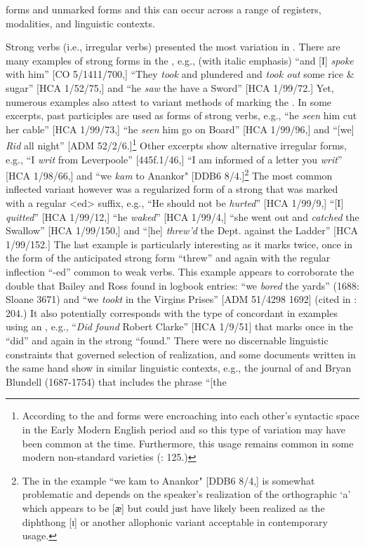  forms and unmarked  forms and this can occur across a range of registers, modalities, and linguistic contexts. 

Strong verbs (i.e., irregular verbs) presented the most variation in . There are many examples of strong  forms in the , e.g., (with italic emphasis) “and [I] \textit{spoke} with him” [CO 5/1411/700,] “They \textit{took} and plundered and \textit{took out} some rice \& sugar” [HCA 1/52/75,] and “he \textit{saw} the  have a Sword” [HCA 1/99/72.] Yet, numerous examples also attest to variant methods of marking the . In some excerpts, past participles are used as  forms of strong verbs, e.g., “he \textit{seen} him cut her cable” [HCA 1/99/73,] “he \textit{seen} him go on Board” [HCA 1/99/96,] and “[we] \textit{Rid} all night” [ADM 52/2/6.]\footnote{According to \citet[95]{Blake2002} the  and  forms were encroaching into each other’s syntactic space in the Early Modern English period and so this type of variation may have been common at the time. Furthermore, this usage remains common in some modern non-standard varieties (\citealt{Cheshire1994}: 125.)} Other excerpts show alternative irregular  forms, e.g., “I \textit{writ} from Leverpoole” [445f.1/46,] “I am informed of a letter you \textit{writ}” [HCA 1/98/66,] and “we \textit{kam} to Anankor" [DDB6 8/4.]\footnote{The  in the example “we kam to Anankor" [DDB6 8/4,] is somewhat problematic and depends on the speaker’s realization of the orthographic ‘a’ which appears to be [{ӕ] but could just have likely been realized as the diphthong [{ɪ}] or another allophonic variant acceptable in contemporary usage.} } The most common inflected variant however was a regularized form of a strong  that was marked with a regular <ed> suffix, e.g., “He should not be \textit{hurted}” [HCA 1/99/9,] “[I] \textit{quitted}” [HCA 1/99/12,] “he \textit{waked}” [HCA 1/99/4,] “she went out and \textit{catched} the Swallow” [HCA 1/99/150,] and “[he] \textit{threw’d} the Dept. against the Ladder” [HCA 1/99/152.] The last example is particularly interesting as it marks  twice, once in the form of the anticipated strong  form “threw” and again with the regular inflection “-ed” common to weak verbs. This example appears to corroborate the double  that Bailey and Ross found in logbook entries: “we \textit{bored} the yards” (1688: Sloane 3671) and “we \textit{tookt} in the Virgins Prises” [ADM 51/4298 1692] (cited in \citealt{BaileyRoss1988}: 204.) It also potentially corresponds with the type of concordant  in examples using an , e.g., “\textit{Did found} Robert Clarke” [HCA 1/9/51] that marks  once in the  “did” and again in the strong  “found.” There were no discernable linguistic constraints that governed selection of  realization, and some documents written in the same hand show  in similar linguistic contexts, e.g., the journal of  and  Bryan Blundell (1687-1754) that includes the phrase “[the 